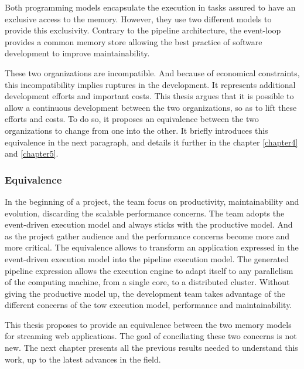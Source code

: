 Both programming models encapsulate the execution in tasks assured to have an exclusive access to the memory.
However, they use two different models to provide this exclusivity.
Contrary to the pipeline architecture, the event-loop provides a common memory store allowing the best practice of software development to improve maintainability.

These two organizations are incompatible.
And because of economical constraints, this incompatibility implies ruptures in the development.
It represents additional development efforts and important costs.
This thesis argues that it is possible to allow a continuous development between the two organizations, so as to lift these efforts and costs.
To do so, it proposes an equivalence between the two organizations to change from one into the other.
It briefly introduces this equivalence in the next paragraph, and details it further in the chapter \ref{chapter4} and \ref{chapter5}.

\subsubsection{Equivalence}

In the beginning of a project, the team focus on productivity, maintainability and evolution, discarding the scalable performance concerns.
The team adopts the event-driven execution model and always sticks with the productive model.
And as the project gather audience and the performance concerns become more and more critical.
The equivalence allows to transform an application expressed in the event-driven execution model into the pipeline execution model.
The generated pipeline expression allows the execution engine to adapt itself to any parallelism of the computing machine, from a single core, to a distributed cluster.
Without giving the productive model up, the development team takes advantage of the different concerns of the tow execution model, performance and maintainability.

\separator

This thesis proposes to provide an equivalence between the two memory models for streaming web applications.
The goal of conciliating these two concerns is not new.
The next chapter presents all the previous results needed to understand this work, up to the latest advances in the field.